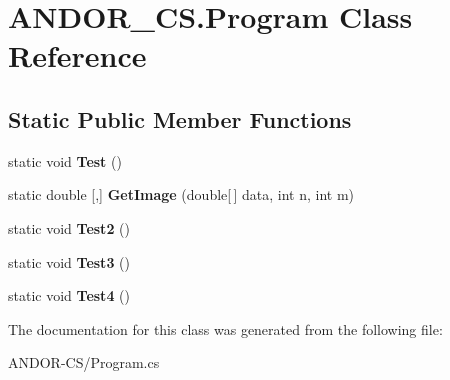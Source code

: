 \hypertarget{class_a_n_d_o_r___c_s_1_1_program}{}\section{A\+N\+D\+O\+R\+\_\+\+C\+S.\+Program Class Reference}
\label{class_a_n_d_o_r___c_s_1_1_program}
\subsection*{Static Public Member Functions}
\begin{DoxyCompactItemize}
\item 
\mbox{\label{class_a_n_d_o_r___c_s_1_1_program_a4e310da9a8635ad23d64e23cb1cdfbcd}} 
static void {\bfseries Test} ()
\item 
\mbox{\label{class_a_n_d_o_r___c_s_1_1_program_a2955cb56f8f3bbf670ac55c0c2d79388}} 
static double \mbox{[},\mbox{]} {\bfseries Get\+Image} (double\mbox{[}$\,$\mbox{]} data, int n, int m)
\item 
\mbox{\label{class_a_n_d_o_r___c_s_1_1_program_a16e995f7a8f8fb24cb695aa78a483275}} 
static void {\bfseries Test2} ()
\item 
\mbox{\label{class_a_n_d_o_r___c_s_1_1_program_a417dc878c7f3951eda7024bcfa7089f0}} 
static void {\bfseries Test3} ()
\item 
\mbox{\label{class_a_n_d_o_r___c_s_1_1_program_aab3bf506bec7f7123522f317698de633}} 
static void {\bfseries Test4} ()
\end{DoxyCompactItemize}


The documentation for this class was generated from the following file\+:\begin{DoxyCompactItemize}
\item 
A\+N\+D\+O\+R-\/\+C\+S/Program.\+cs\end{DoxyCompactItemize}

